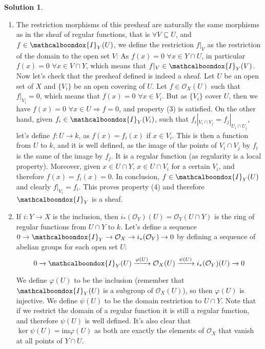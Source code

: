 \documentclass[12pt]{article}
\newcommand{\imp}{\ensuremath{\Rightarrow}}
\newcommand{\ima}{\ensuremath{\mathrm{im}}}
\newcommand{\locO}{\ensuremath{\mathcal{O}}}
\theoremstyle{definition}
\newtheorem*{sol}{Solution}
\newcommand{\sI}{\ensuremath{\mathcalboondox{I}}}
\begin{document}
\begin{sol}
	\begin{enumerate}[label = \alph*)]
		\item The restriction morphisms of this presheaf are naturally the same morphisms as in the sheaf of regular functions, that is $\forall V \subseteq U$, and $f \in \sI_Y(U)$, we define the restriction $f|_V$ as the restriction of the domain to the open set $V$: As $f(x) = 0 \, \, \forall x \in Y \cap U$, in particular $f(x) = 0 \, \, \forall x \in V \cap Y$, which means that $f|_V \in \sI_Y(V)$. Now let's check that the presheaf defined is indeed a sheaf. Let $U$ be an open set of $X$ and $\{V_i\}$ be an open covering of $U$. Let $f \in \locO_X(U)$ such that $f|_{V_i} = 0$, which means that $f(x) = 0 \, \, \forall x \in V_i$. But as $\{V_i\}$ cover $U$, then we have $f(x) = 0 \, \, \forall x \in U \imp f = 0$, and property (3) is satisfied. On the other hand, given $f_i \in \sI_Y(V_i)$, such that $f_i|_{V_i \cap V_j} = f_j|_{U_i \cap U_j}$, let's define $f: U \to k$, as $f(x) = f_i(x)$ if $x \in V_i$. This is then a function from $U$ to $k$, and it is well defined, as the image of the points of $V_i \cap V_j$ by $f_i$ is the same of the image by $f_j$. It is a regular function (as regularity is a local property). Moreover, given $x \in U \cap Y$, $x \in U \cap V_i$ for a certain $V_i$, and therefore $f(x) = f_i(x) = 0$. In conclusion, $f \in \sI_Y(U)$ and clearly $f|_{V_i} = f_i$. This proves property (4) and therefore $\sI_Y$ is a sheaf.

		\item If $i: Y \to X$ is the inclusion, then $i_*(\locO_Y)(U) = \locO_Y(U \cap Y)$ is the ring of regular functions from $U \cap Y$ to $k$. Let's define a sequence $0 \to \sI_Y \to \locO_X \to i_*(\locO_Y) \to 0$ by defining a sequence of abelian groups for each open set $U$:
		\[
			0 \xrightarrow{} \sI_Y(U) \xrightarrow{\varphi(U)} \locO_X(U) \xrightarrow{\psi(U)} i_*(\locO_Y)(U) \xrightarrow{} 0
		\] 

		We define $\varphi(U)$ to be the inclusion (remember that $\sI_Y(U)$ is a subgroup of $\locO_X(U)$), so then $\varphi(U)$ is injective. We define $\psi(U)$ to be the domain restriction to $U \cap Y$. Note that if we restrict the domain of a regular function it is still a regular function, and therefore $\psi(U)$ is well defined. It's also clear that $\ker \psi(U) = \ima \varphi(U)$ as both are exactly the elements of $\locO_X$ that vanish at all points of $Y \cap U$.


\end{enumerate}
\end{sol}
\end{document}
